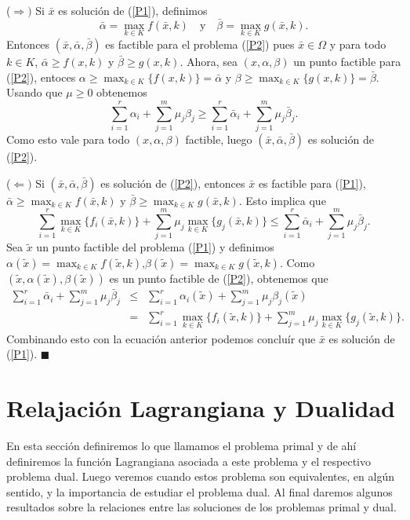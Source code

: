 \documentclass[a4paper,12pt]{report}
\newcommand{\bx}{\bar{x}}
\newenvironment{dem}{\vspace*{-0.1cm}{\it Demostraci\'on:}}{\hfill
$\blacksquare$\\}
\begin{document}
\begin{dem}
($\Rightarrow)$ Si $\bx$ es soluci\'on de (\ref{P1}), definimos 
$$\bar{\alpha}=\max_{k\in K}f(\bx,k)\quad\mbox{y}\quad \bar{\beta}=\max_{k\in K}g(\bx,k).$$
Entonces $(\bx,\bar{\alpha},\bar{\beta})$ es factible para el problema (\ref{P2}) pues $\bx\in\Omega$ y para todo \linebreak $k\in K$, $\bar{\alpha}\geq f(x,k)$ y $\bar{\beta}\geq g(x,k)$. Ahora, sea $(x,\alpha,\beta)$ un punto factible para (\ref{P2}), entoces $\alpha\geq \max_{k\in K}\{f(x,k)\}=\bar{\alpha}$ y $\beta\geq\max_{k\in K}\{g(x,k)\}=\bar{\beta}$. Usando que $\mu\geq 0$ obtenemos $$\sum_{i=1}^{r}\alpha_i+\sum_{j=1}^{m}\mu_j\beta_j \geq\sum_{i=1}^r\bar{\alpha}_i+\sum_{j=1}^m\mu_j\bar{\beta}_j.$$
Como esto vale para todo $(x,\alpha,\beta)$ factible, luego $(\bx,\bar{\alpha},\bar{\beta})$ es soluci\'on de (\ref{P2}).


($\Leftarrow)$ Si $(\bx,\bar{\alpha},\bar{\beta})$ es soluci\'on de (\ref{P2}), entonces $\bx$ es factible para (\ref{P1}), \linebreak $\bar{\alpha}\geq\max_{k\in K}f(\bx,k)$ y $\bar{\beta}\geq\max_{k\in K}g(\bx,k)$. Esto implica que
$$
 \sum_{i=1}^{r}\max_{k\in K}\{f_i(\bx,k)\} + \sum_{j=1}^m\mu_j\max_{k\in K}\{g_j(\bx,k)\} \leq\sum_{i=1}^r\bar{\alpha}_i+\sum_{j=1}^m\mu_j\bar{\beta}_j.
$$
Sea $\tilde{x}$ un punto factible del problema (\ref{P1}) y definimos $\alpha(\tilde{x})=\max_{k\in K}f(\tilde{x},k)$,\linebreak $\beta(\tilde{x})=\max_{k\in K}g(\tilde{x},k)$. Como $(\tilde{x},\alpha(\tilde{x}),\beta(\tilde{x}))$ es un punto factible de (\ref{P2}), obtenemos que
\begin{eqnarray*}
\sum_{i=1}^r\bar{\alpha}_i+\sum_{j=1}^m\mu_j\bar{\beta}_j
&\leq&\sum_{i=1}^r\alpha_i(\tilde{x})+\sum_{j=1}^m\mu_j\beta_j(\tilde{x})\\
&=&\sum_{i=1}^r\max_{k\in K}\{f_i(\tilde{x},k)\}+\sum_{j=1}^m\mu_j\max_{k\in K}\{g_j(\tilde{x},k)\}.
\end{eqnarray*}
Combinando esto con la ecuaci\'on anterior podemos conclu\'ir que $\bx$ es soluci\'on de (\ref{P1}).
\end{dem}

\section{Relajaci\'on Lagrangiana y Dualidad}

En esta secci\'on definiremos lo que llamamos el problema primal y de ah\'i definiremos la funci\'on Lagrangiana asociada a este problema y el respectivo problema dual. Luego veremos cuando estos problema son equivalentes, en alg\'un sentido, y la importancia de estudiar el problema dual. Al final daremos algunos resultados sobre la relaciones entre las soluciones de los problemas primal y dual.
\end{document}

